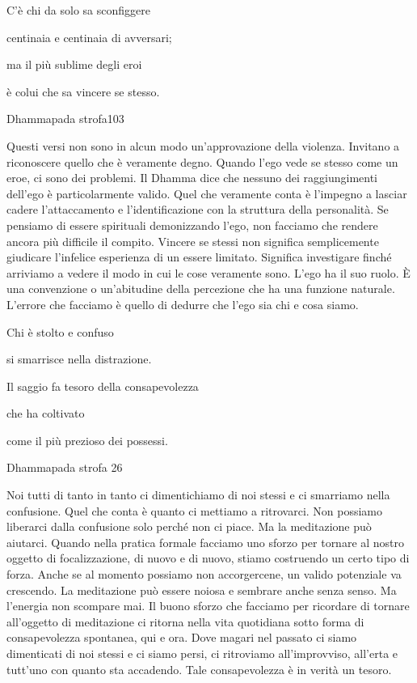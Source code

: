 \documentclass[a4paper,portrait,12pt]{article}
\begin{document}
\newpage



C'\`{e} chi da solo sa sconfiggere 


centinaia e centinaia di avversari;


ma il più sublime degli eroi


\`{e} colui che sa vincere se stesso.





Dhammapada strofa103


\newpage



Questi versi non sono in alcun modo un'approvazione della violenza. Invitano a riconoscere quello che \`{e} veramente degno. Quando l'ego vede se stesso come un eroe, ci sono dei problemi. Il Dhamma dice che nessuno dei raggiungimenti dell'ego \`{e} particolarmente valido. Quel che veramente conta \`{e} l'impegno a lasciar cadere l'attaccamento e l'identificazione con la struttura della personalit\`{a}. Se pensiamo di essere spirituali demonizzando l'ego, non facciamo che rendere ancora più difficile il compito. Vincere se stessi non significa semplicemente giudicare l'infelice esperienza di un essere limitato. Significa investigare finch\'{e} arriviamo a vedere il modo in cui le cose veramente sono. L'ego ha il suo ruolo. \`{E} una convenzione o un'abitudine della percezione che ha una funzione naturale. L'errore che facciamo \`{e} quello di dedurre che l'ego sia chi e cosa siamo.


\newpage



Chi \`{e} stolto e confuso


si smarrisce nella distrazione.


Il saggio fa tesoro della consapevolezza


che ha coltivato	


come il più prezioso dei possessi.





Dhammapada strofa 26


\newpage



Noi tutti di tanto in tanto ci dimentichiamo di noi stessi e ci smarriamo nella confusione. Quel che conta \`{e} quanto ci mettiamo a ritrovarci. Non possiamo liberarci dalla confusione solo perch\'{e} non ci piace. Ma la meditazione pu\`{o} aiutarci. Quando nella pratica formale facciamo uno sforzo per tornare al nostro oggetto di focalizzazione, di nuovo e di nuovo, stiamo costruendo un certo tipo di forza. Anche se al momento possiamo non accorgercene, un valido potenziale va crescendo. La meditazione pu\`{o} essere noiosa e sembrare anche senza senso. Ma l'energia non scompare mai. Il buono sforzo che facciamo per ricordare di tornare all'oggetto di meditazione ci ritorna nella vita quotidiana sotto forma di consapevolezza spontanea, qui e ora. Dove magari nel passato ci siamo dimenticati di noi stessi e ci siamo persi, ci ritroviamo all'improvviso, all'erta e tutt'uno con quanto sta accadendo. Tale consapevolezza \`{e} in verit\`{a} un tesoro.
\end{document}

